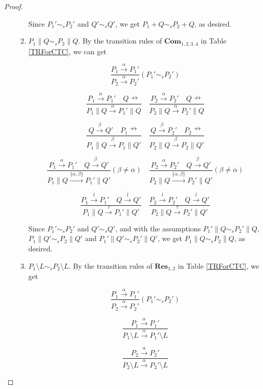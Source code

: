 \begin{proof}
\begin{enumerate}
\begin{enumerate}
           Since $P_1'\sim_s P_2'$ and $Q'\sim_s Q'$, we get $P_1+Q\sim_s P_2+Q$, as desired.
           \item $P_1\parallel Q\sim_s P_2\parallel Q$. By the transition rules of $\textbf{Com}_{1,2,3,4}$ in Table \ref{TRForCTC}, we can get

           $$\frac{P_1\xrightarrow{\alpha}P_1'}{P_2\xrightarrow{\alpha}P_2'}(P_1'\sim_s P_2')$$

           $$\frac{P_1\xrightarrow{\alpha}P_1'\quad Q\nrightarrow}{P_1\parallel Q\xrightarrow{\alpha}P_1'\parallel Q}
           \quad \frac{P_2\xrightarrow{\alpha}P_2'\quad Q\nrightarrow}{P_2\parallel Q\xrightarrow{\alpha}P_2'\parallel Q}$$

           $$\frac{Q\xrightarrow{\beta}Q'\quad P_1\nrightarrow}{P_1\parallel Q\xrightarrow{\beta}P_1\parallel Q'}
           \quad \frac{Q\xrightarrow{\beta}P_2'\quad P_2\nrightarrow}{P_2\parallel Q\xrightarrow{\beta}P_2\parallel Q'}$$

           $$\frac{P_1\xrightarrow{\alpha}P_1'\quad Q\xrightarrow{\beta}Q'}{P_1\parallel Q\xrightarrow{\{\alpha,\beta\}}P_1'\parallel Q'}(\beta\neq\overline{\alpha})
           \quad \frac{P_2\xrightarrow{\alpha}P_2'\quad Q\xrightarrow{\beta}Q'}{P_2\parallel Q\xrightarrow{\{\alpha,\beta\}}P_2'\parallel Q'}(\beta\neq\overline{\alpha})$$

           $$\frac{P_1\xrightarrow{l}P_1'\quad Q\xrightarrow{\overline{l}}Q'}{P_1\parallel Q\xrightarrow{\tau}P_1'\parallel Q'}
           \quad \frac{P_2\xrightarrow{l}P_2'\quad Q\xrightarrow{\overline{l}}Q'}{P_2\parallel Q\xrightarrow{\tau}P_2'\parallel Q'}$$

           Since $P_1'\sim_s P_2'$ and $Q'\sim_s Q'$, and with the assumptions $P_1'\parallel Q\sim_s P_2'\parallel Q$, $P_1\parallel Q'\sim_s P_2\parallel Q'$ and $P_1'\parallel Q'\sim_s P_2'\parallel Q'$, we get $P_1\parallel Q\sim_s P_2\parallel Q$, as desired.
           \item $P_1\setminus L\sim_s P_2\setminus L$. By the transition rules of $\textbf{Res}_{1,2}$ in Table \ref{TRForCTC}, we get

           $$\frac{P_1\xrightarrow{\alpha}P_1'}{P_2\xrightarrow{\alpha}P_2'}(P_1'\sim_s P_2')$$

           $$\frac{P_1\xrightarrow{\alpha}P_1'}{P_1\setminus L\xrightarrow{\alpha}P_1'\setminus L}$$

           $$\frac{P_2\xrightarrow{\alpha}P_2'}{P_2\setminus L\xrightarrow{\alpha}P_2'\setminus L}$$


\end{enumerate}
\end{enumerate}
\end{proof}
